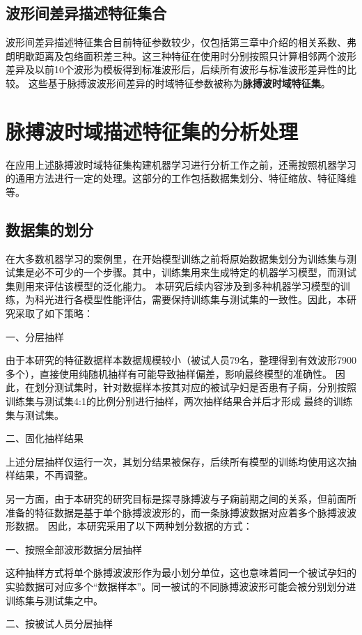\subsection{波形间差异描述特征集合}
波形间差异描述特征集合目前特征参数较少，仅包括第三章中介绍的相关系数、弗朗明歇距离及包络面积差三种。这三种特征在使用时分别按照只计算相邻两个波形差异及以前10个波形为模板得到标准波形后，后续所有波形与标准波形差异性的比较。
这些基于脉搏波波形间差异的时域特征参数被称为\textbf{脉搏波时域特征集}。

\section{脉搏波时域描述特征集的分析处理}
在应用上述脉搏波时域特征集构建机器学习进行分析工作之前，还需按照机器学习的通用方法进行一定的处理。这部分的工作包括数据集划分、特征缩放、特征降维等。
\subsection{数据集的划分}
在大多数机器学习的案例里，在开始模型训练之前将原始数据集划分为训练集与测试集是必不可少的一个步骤。其中，训练集用来生成特定的机器学习模型，而测试集则用来评估该模型的泛化能力。
本研究后续内容涉及到多种机器学习模型的训练，为科光进行各模型性能评估，需要保持训练集与测试集的一致性。因此，本研究采取了如下策略：

一、分层抽样

由于本研究的特征数据样本数据规模较小（被试人员79名，整理得到有效波形7900多个），直接使用纯随机抽样有可能导致抽样偏差，影响最终模型的准确性\cite{Aurélien2018}。
因此，在划分测试集时，针对数据样本按其对应的被试孕妇是否患有子痫，分别按照训练集与测试集4:1的比例分别进行抽样，两次抽样结果合并后才形成
最终的训练集与测试集。

二、固化抽样结果

上述分层抽样仅运行一次，其划分结果被保存，后续所有模型的训练均使用这次抽样结果，不再调整。

另一方面，由于本研究的研究目标是探寻脉搏波与子痫前期之间的关系，但前面所准备的特征数据是基于单个脉搏波波形的，而一条脉搏波数据对应着多个脉搏波波形数据。
因此，本研究采用了以下两种划分数据的方式：

一、按照全部波形数据分层抽样

这种抽样方式将单个脉搏波波形作为最小划分单位，这也意味着同一个被试孕妇的实验数据可对应多个“数据样本”。同一被试的不同脉搏波波形可能会被分别划分进训练集与测试集之中。

二、按被试人员分层抽样

